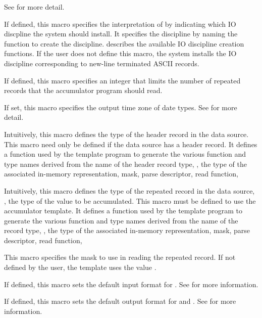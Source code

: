 \begin{description}
  See  for more detail.
\item[\cd{IO\_DISC\_MK}] If defined, this macro specifies the
  interpretation of \Precord{} by indicating which IO discpline the
  system should install.  It specifies the discipline by naming the
  function to create the discipline. 
  describes the available IO discipline creation functions.  If the
  user does not define this macro, the system installs the IO
  discipline corresponding to  new-line terminated ASCII records.
\item[\cd{MAX\_RECS}] If defined, this macro specifies an integer that
  limits the number of repeated records that the accumulator program
  should read.
\item[\cd{OUT\_TIME\_ZONE}] If set, this macro specifies the output
  time zone of date types.
  See  for more detail.
\item[\cd{PADS\_HDR\_TY}]  Intuitively, this macro defines the 
  type of the header record in the data source.  This macro need only
  be defined if the data source has a header record.
  It defines a function used by the template
  program to generate the various function and type names derived from
  the name of the header record type, \ie{}, the type of the associated
  in-memory representation, mask, parse descriptor, read function,
  \etc{}
\item[\cd{PADS\_TY}]  Intuitively, this macro defines the 
  type of the repeated record in the data source, \ie{}, the type of
  the value to be accumulated.  This macro must be defined to use the
  accumulator template.  It defines a function used by the template
  program to generate the various function and type names derived from
  the name of the record type, \ie{}, the type of the associated
  in-memory representation, mask, parse descriptor, read function,
  \etc{}
\item[\cd{READ\_MASK}] This macro specifies the mask to use in reading
  the repeated record.  If not defined by the user, the template uses
  the value .
\item[\cd{TIME\_IN\_FMT}] If defined, this macro sets the default
  input format for .  See
   for more
  information.
\item[\cd{TIME\_OUT\_FMT}] If defined, this macro sets the default
  output format for  and .  See
   for more information.

\end{description}

